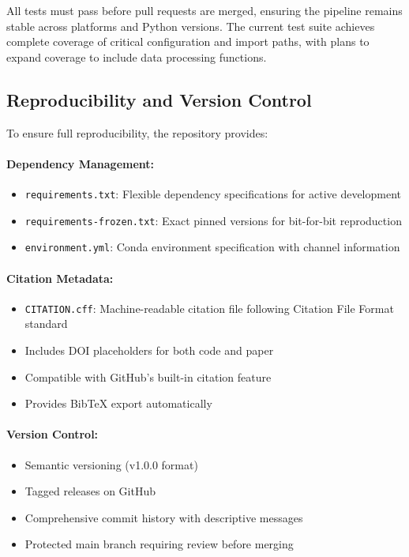 \documentclass[a4paper, fleqn, 11pt]{article}
\newcommand{\filepath}[1]{\texttt{#1}}
\begin{document}
All tests must pass before pull requests are merged, ensuring the pipeline remains stable across platforms and Python versions. The current test suite achieves complete coverage of critical configuration and import paths, with plans to expand coverage to include data processing functions.

\subsection{Reproducibility and Version Control}

To ensure full reproducibility, the repository provides:

\paragraph{Dependency Management:}
\begin{itemize}
    \item \filepath{requirements.txt}: Flexible dependency specifications for active development
    \item \filepath{requirements-frozen.txt}: Exact pinned versions for bit-for-bit reproduction
    \item \filepath{environment.yml}: Conda environment specification with channel information
\end{itemize}

\paragraph{Citation Metadata:}
\begin{itemize}
    \item \filepath{CITATION.cff}: Machine-readable citation file following Citation File Format standard
    \item Includes DOI placeholders for both code and paper
    \item Compatible with GitHub's built-in citation feature
    \item Provides BibTeX export automatically
\end{itemize}

\paragraph{Version Control:}
\begin{itemize}
    \item Semantic versioning (v1.0.0 format)
    \item Tagged releases on GitHub
    \item Comprehensive commit history with descriptive messages
    \item Protected main branch requiring review before merging
\end{itemize}
\end{document}
